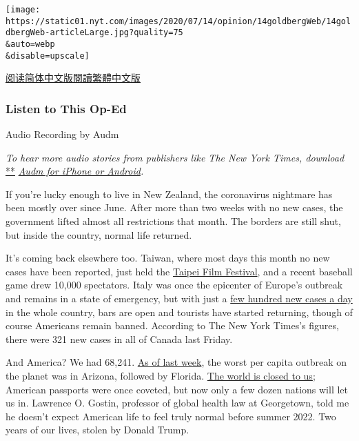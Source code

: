 \texttt{[image: https://static01.nyt.com/images/2020/07/14/opinion/14goldbergWeb/14goldbergWeb-articleLarge.jpg?quality=75\\\&auto=webp\\\&disable=upscale]}

\href{https://cn.nytimes.com/opinion/20200714/us-coronavirus-trump/}{阅读简体中文版}\href{https://cn.nytimes.com/opinion/20200714/us-coronavirus-trump/zh-hant/}{閱讀繁體中文版}

\hypertarget{listen-to-this-op-ed}{%
\subsubsection{Listen to This Op-Ed}\label{listen-to-this-op-ed}}

Audio Recording by Audm

\emph{To hear more audio stories from publishers like The New York
Times, download}
\href{https://www.audm.com/?utm_source=nytmag\&utm_medium=embed\&utm_campaign=left_behind_draper}{**}
\href{https://www.audm.com/?utm_source=nytopinion\&utm_medium=embed\&utm_campaign=countries_normal_life}{\emph{Audm
for iPhone or Android}}\emph{.}

If you're lucky enough to live in New Zealand, the coronavirus nightmare
has been mostly over since June. After more than two weeks with no new
cases, the government lifted almost all restrictions that month. The
borders are still shut, but inside the country, normal life returned.

It's coming back elsewhere too. Taiwan, where most days this month no
new cases have been reported, just held the
\href{https://www.startribune.com/asia-today-no-masks-on-red-carpet-as-taiwan-logs-few-cases/571731572/}{Taipei
Film Festival}, and a recent baseball game drew 10,000 spectators. Italy
was once the epicenter of Europe's outbreak and remains in a state of
emergency, but with just a
\href{https://www.nytimes.com/interactive/2020/world/europe/italy-coronavirus-cases.html}{few
hundred new cases a day} in the whole country, bars are open and
tourists have started returning, though of course Americans remain
banned. According to The New York Times's figures, there were 321 new
cases in all of Canada last Friday.

And America? We had 68,241.
\href{https://www.nytimes.com/2020/07/08/briefing/arizona-mary-trump-facebook-your-wednesday-briefing.html}{As
of last week}, the worst per capita outbreak on the planet was in
Arizona, followed by Florida.
\href{https://www.nytimes.com/2020/07/07/travel/american-travelers-restrictions-coronavirus.html}{The
world is closed to us}; American passports were once coveted, but now
only a few dozen nations will let us in. Lawrence O. Gostin, professor
of global health law at Georgetown, told me he doesn't expect American
life to feel truly normal before summer 2022. Two years of our lives,
stolen by Donald Trump.

